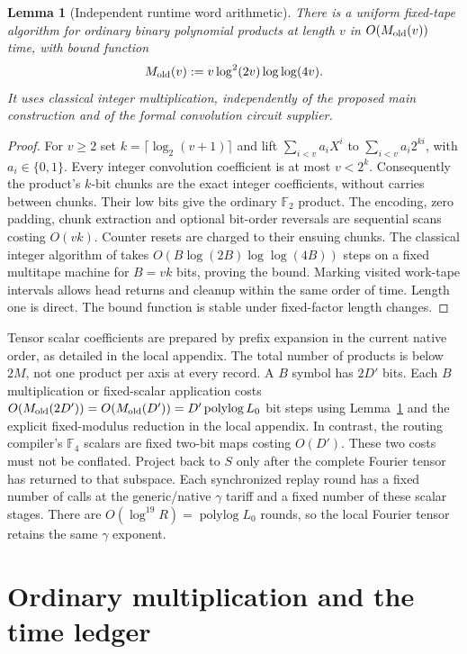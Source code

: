 \documentclass[11pt]{article}
\newtheorem{lemma}[theorem]{Lemma}
\newcommand{\F}{\mathbb F}
\newcommand{\polylog}{\operatorname{polylog}}
\begin{document}
\begin{lemma}[Independent runtime word arithmetic]
\label{lem:old-word}
There is a uniform fixed-tape algorithm for ordinary binary polynomial
products at length $v$ in $O(M_{\rm old}(v))$ time, with bound function
\[
 M_{\rm old}(v):=v\log^2(2v)\log\log(4v).
\]
It uses classical integer multiplication, independently of the proposed
main construction and of the formal convolution circuit supplier.
\end{lemma}
\begin{proof}
For $v\ge2$ set $k=\lceil\log_2(v+1)\rceil$ and lift
$\sum_{i<v}a_iX^i$ to $\sum_{i<v}a_i2^{ki}$, with $a_i\in\{0,1\}$.
Every integer convolution coefficient is at most $v<2^k$.
Consequently the product's $k$-bit chunks are the exact integer
coefficients, without carries between chunks. Their low bits give the
ordinary $\F_2$ product. The encoding, zero padding, chunk extraction
and optional bit-order reversals are sequential scans costing $O(vk)$.
Counter resets are charged to their ensuing chunks. The classical
integer algorithm of \cite{schonhage-strassen} takes
$O(B\log(2B)\log\log(4B))$ steps on a fixed multitape machine for
$B=vk$ bits, proving the bound. Marking visited work-tape intervals
allows head returns and cleanup within the same order of time.
Length one is direct. The bound function is stable under fixed-factor
length changes.
\end{proof}

Tensor scalar coefficients are prepared by prefix expansion in the
current native order, as detailed in the local appendix. The total
number of products is below $2M$, not one product per axis at every
record. A $B$
symbol has $2D'$ bits. Each $B$ multiplication or fixed-scalar
application costs $O(M_{\rm old}(2D'))=O(M_{\rm old}(D'))
=D'\polylog L_0$ bit steps using Lemma~\ref{lem:old-word} and the
explicit fixed-modulus reduction in the local appendix.
In contrast, the routing compiler's $\F_4$
scalars are fixed two-bit maps costing $O(D')$. These two costs must
not be conflated. Project back to $S$ only after the complete Fourier
tensor has returned to that subspace.
Each synchronized replay round has a fixed number of calls at the
generic/native $\gamma$ tariff and a fixed number of these scalar
stages. There are $O(\log^{19} R)=\operatorname{polylog}L_0$ rounds,
so the local Fourier tensor retains the same $\gamma$ exponent.

\section{Ordinary multiplication and the time ledger}
\end{document}
